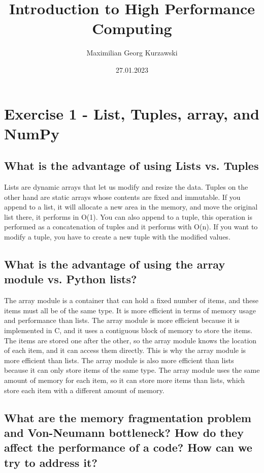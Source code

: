 \documentclass{article}
\title{Introduction to High Performance Computing}
\author{Maximilian Georg Kurzawski}
\date{27.01.2023}
\begin{document}
\maketitle

\section{Exercise 1 - List, Tuples, array, and NumPy}

\subsection{What is the advantage of using Lists vs. Tuples}

Lists are dynamic arrays that let us modify and resize the data. 
Tuples on the other hand are static arrays whose contents are fixed and immutable. 
If you append to a list, it will allocate a new area in the memory, and move the original list there, it performs in O(1). 
You can also append to a tuple, this operation is performed as a concatenation of tuples and it performs with O(n). 
If you want to modify a tuple, you have to create a new tuple with the modified values.

\subsection{What is the advantage of using the array module vs. Python lists?}

The array module is a container that can hold a fixed number of items, and these items must all be of the same type. 
It is more efficient in terms of memory usage and performance than lists. 
The array module is more efficient because it is implemented in C, and it uses a contiguous block of memory to store the items. 
The items are stored one after the other, so the array module knows the location of each item, and it can access them directly. 
This is why the array module is more efficient than lists. 
The array module is also more efficient than lists because it can only store items of the same type. 
The array module uses the same amount of memory for each item, so it can store more items than lists, which store each item with a different amount of memory.


\subsection{What are the memory fragmentation problem and Von-Neumann bottleneck? How do they affect the performance of a code? How can we try to address it?}
\end{document}
